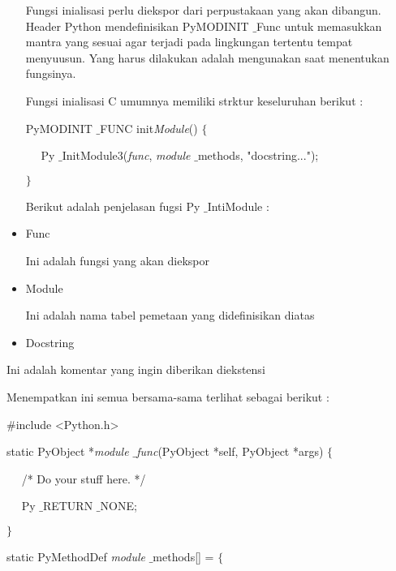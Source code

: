 \documentclass[a4paper,12pt]{report}
\begin{document}
\begin{itemize}
\noindent 
 \hspace*{0.5in} Fungsi inialisasi perlu diekspor dari perpustakaan yang akan dibangun. Header Python mendefinisikan PyMODINIT $  \_  $Func untuk memasukkan mantra yang sesuai agar terjadi pada lingkungan tertentu tempat menyuusun. Yang harus dilakukan adalah mengunakan saat menentukan fungsinya. \par
\noindent 
 \hspace*{0.5in} Fungsi inialisasi C umumnya memiliki strktur keseluruhan berikut : \par
\noindent 
PyMODINIT $  \_  $FUNC init\textit{Module}()  $  \{  $ \par
\noindent 
~~ Py $  \_  $InitModule3(\textit{func}, \textit{module} $  \_  $methods, "docstring..."); \par
\noindent 
 $  \}  $ \par
\vspace{12pt}
\noindent 
Berikut adalah penjelasan fugsi Py $  \_  $IntiModule : \par
\noindent 
\item Func  \par
\noindent 
Ini adalah fungsi yang akan diekspor \par
\noindent 
\item Module \par
\noindent 
Ini adalah nama tabel pemetaan yang didefinisikan diatas \par
\noindent 
\item Docstring\end{itemize}
 \par
\noindent 
Ini adalah komentar yang ingin diberikan diekstensi \par
\vspace{12pt}
\noindent 
 \hspace*{0.5in} Menempatkan ini semua bersama-sama terlihat sebagai berikut : \par
\noindent 
 $  \#  $include <Python.h> \par
\vspace{12pt}
\noindent 
static PyObject *\textit{module $  \_  $func}(PyObject *self, PyObject *args)  $  \{  $ \par
\noindent 
~~ /* Do your stuff here. */ \par
\noindent 
~~ Py $  \_  $RETURN $  \_  $NONE; \par
\noindent 
 $  \}  $ \par
\vspace{12pt}
\noindent 
static PyMethodDef \textit{module} $  \_  $methods[] =  $  \{  $ \par
\end{document}
